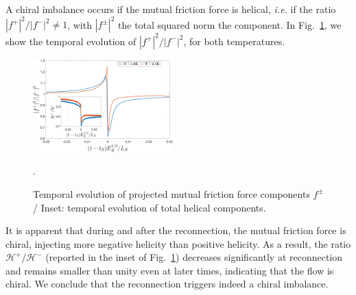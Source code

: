 \documentclass[%
 reprint,
 amsmath,amssymb,
 aps,
 prl,
]{revtex4-2}
\begin{document}
{A chiral imbalance occurs if the mutual friction force is helical, 
\textit{i.e.} if the ratio $|f^+|^2/|f^-|^2 \neq 1$, with $|f^\pm|^2$ the total squared norm the component. 
In Fig.~\ref{fig:mutual-friction-decomp}, we show the temporal evolution of $|f^+|^2/|f^-|^2$, for both temperatures. 
%
\begin{figure}[h!]
    \centering
    \includegraphics*[width=0.48\textwidth]{fmfDecompFig.pdf}
    \caption{Temporal evolution of projected mutual friction force components $f^\pm$/ Inset: temporal evolution of total helical components.}.
    \label{fig:mutual-friction-decomp}
\end{figure}
%
It is apparent
that during and after the reconnection, the mutual friction force is chiral,
injecting more negative helicity than positive helicity. 
As a result, the ratio $\mathcal{H}^+/\mathcal{H}^-$ 
(reported in the inset of Fig.~\ref{fig:mutual-friction-decomp}) 
decreases significantly at reconnection and remains smaller than unity even at later times, 
indicating that the flow is chiral. We conclude that the reconnection triggers indeed a chiral imbalance.


  

}
\end{document}
